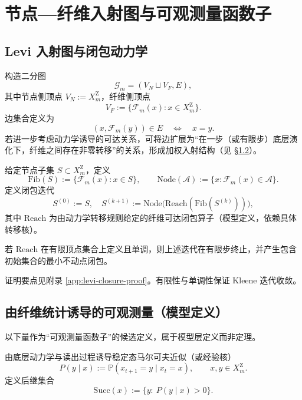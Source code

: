 \section{节点—纤维入射图与可观测量函数子}

\subsection{Levi 入射图与闭包动力学}

\begin{definition}[节点—纤维 Levi 图]\label{def:levi-graph}
构造二分图
\[
\mathcal{G}_m=(V_N\sqcup V_F, E),
\]
其中节点侧顶点 $V_N:=X_m^{\mathrm Z}$，纤维侧顶点
\[
V_F:=\{\mathcal{F}_m(x):x\in X_m^{\mathrm Z}\}.
\]
边集合定义为
\[
(x,\mathcal{F}_m(y))\in E\quad \Longleftrightarrow\quad x=y.
\]
若进一步考虑动力学诱导的可达关系，可将边扩展为“在一步（或有限步）底层演化下，纤维之间存在非零转移”的关系，形成加权入射结构（见 \S\ref{sec:induced-observables}）。
\end{definition}

\begin{definition}[纤维优先闭包算子]\label{def:fiber-closure}
给定节点子集 $S\subset X_m^{\mathrm Z}$，定义
\[
\mathrm{Fib}(S):=\{\mathcal{F}_m(x):x\in S\},\qquad
\mathrm{Node}(\mathcal{A}):=\{x:\mathcal{F}_m(x)\in\mathcal{A}\}.
\]
定义闭包迭代
\[
S^{(0)}:=S,\quad S^{(k+1)}:=\mathrm{Node}\bigl(\mathrm{Reach}(\mathrm{Fib}(S^{(k)}))\bigr),
\]
其中 $\mathrm{Reach}$ 为由动力学转移规则给定的纤维可达闭包算子（模型定义，依赖具体转移核）。
\end{definition}

\begin{theorem}[有限闭包正确性]\label{thm:finite-closure}
若 $\mathrm{Reach}$ 在有限顶点集合上定义且单调，则上述迭代在有限步终止，并产生包含初始集合的最小不动点闭包。
\end{theorem}

\begin{remark}
证明要点见附录 \ref{app:levi-closure-proof}。有限性与单调性保证 Kleene 迭代收敛。
\end{remark}

\subsection{由纤维统计诱导的可观测量（模型定义）}\label{sec:induced-observables}

以下量作为“可观测量函数子”的候选定义，属于模型层定义而非定理。

\begin{definition}[稳定态转移核（模型）]\label{def:markov-kernel}
由底层动力学与读出过程诱导稳定态马尔可夫近似（或经验核）
\[
P(y\mid x):=\mathbb{P}(x_{t+1}=y\mid x_t=x),
\qquad x,y\in X_m^{\mathrm Z}.
\]
定义后继集合
\[
\mathrm{Succ}(x):=\{y:\ P(y\mid x)>0\}.
\]
\end{definition}

